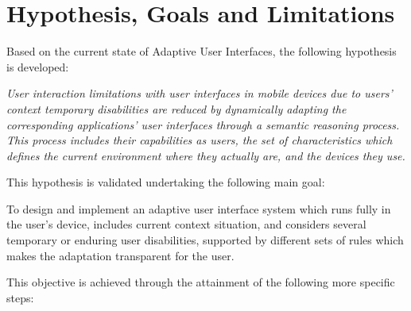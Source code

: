\section{Hypothesis, Goals and Limitations}
\label{sec:hypothesis}
Based on the current state of Adaptive User Interfaces, the following hypothesis
is developed:
 
\begin{framed}
\textit{User interaction limitations with user interfaces in mobile devices due 
to users' context temporary disabilities are reduced by dynamically adapting the 
corresponding applications' user interfaces through a semantic reasoning process. 
This process includes their capabilities as users, the set of characteristics 
which defines the current environment where they actually are, and the devices 
they use. }
\end{framed}

This hypothesis is validated undertaking the following main goal:

\begin{framed}
 To design and implement an adaptive user interface system which runs fully in
 the user's device, includes current context situation, and considers several
 temporary or enduring user disabilities, supported by different sets of rules
 which makes the adaptation transparent for the user.
\end{framed}


This objective is achieved through the attainment of the following more specific
steps:

